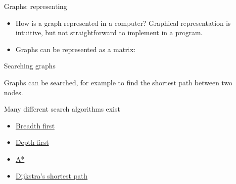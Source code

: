 \documentclass[compress]{beamer}
\begin{document}
\begin{frame}{Graphs: representing}

\begin{itemize}
\item How is a graph represented in a computer? Graphical representation is
  intuitive, but not straightforward to implement in a program.
\item Graphs can be represented as a matrix:
\end{itemize}



\end{frame}

\begin{frame}{Searching graphs}

Graphs can be searched, for example to find the shortest path between
two nodes.

Many different search algorithms exist

\begin{itemize}
\item \href{http://en.wikipedia.org/wiki/Breadth-first_search}{Breadth
  first}
\item \href{http://en.wikipedia.org/wiki/Depth-first_search}{Depth first}
\item \href{http://en.wikipedia.org/wiki/A*_search_algorithm}{A*}
\item \href{http://en.wikipedia.org/wiki/Dijkstra's_algorithm}{Dijkstra's
  shortest path}
\end{itemize}

\end{frame}
\end{document}
